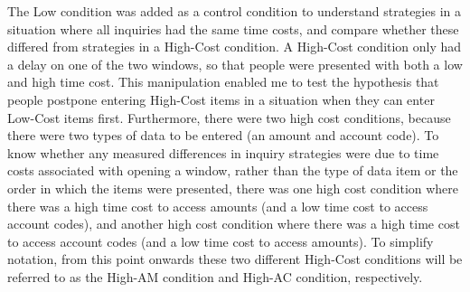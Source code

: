 The Low condition was added as a control condition to understand strategies in a situation where all inquiries had the same time costs, and compare whether these differed from strategies in a High-Cost condition. A High-Cost condition only had a delay on one of the two windows, so that people were presented with both a low and high time cost. This manipulation enabled me to test the hypothesis that people postpone entering High-Cost items in a situation when they can enter Low-Cost items first. Furthermore, there were two high cost conditions, because there were two types of data to be entered (an amount and account code). To know whether any measured differences in inquiry strategies were due to time costs associated with opening a window, rather than the type of data item or the order in which the items were presented, there was one high cost condition where there was a high time cost to access amounts (and a low time cost to access account codes), and another high cost condition where there was a high time cost to access account codes (and a low time cost to access amounts). To simplify notation, from this point onwards these two different High-Cost conditions will be referred to as the High-AM condition and High-AC condition, respectively. 




